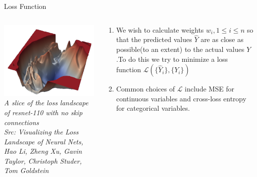 \usebackgroundtemplate{ }

\begin{frame}{Loss Function}
  \begin{columns}[T]
  \begin{column}{0.4\textwidth}
    \includegraphics[width=\textwidth]{images/resnet110-noskip-loss.png}
    \tiny{\textit{A slice of the loss landscape of resnet-110 with no skip connections\\ Src: Visualizing the Loss Landscape of Neural Nets, Hao Li, Zheng Xu, Gavin Taylor, Christoph Studer, Tom Goldstein}}
  \end{column}
  \begin{column}{0.6\textwidth}
  \begin{enumerate}[$\bullet$]
  \item We wish to calculate weights $w_i,1\leq i\leq n$ so that the predicted values $\hat{Y}$ are as close as possible(to an extent) to the actual values $Y$.\pause To do this we try to minimize a loss function $\mathcal{L}(\{\hat Y_i\},\{Y_i\})$\pause
  \item Common choices of $\mathcal L$ include MSE for continuous variables and cross-loss entropy for categorical variables.
  \end{enumerate}
  \end{column}
\end{columns}
\end{frame}


